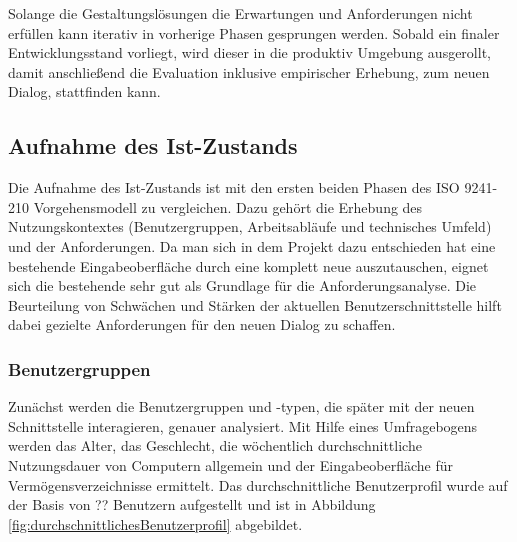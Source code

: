 Solange die Gestaltungslösungen die Erwartungen und Anforderungen nicht erfüllen kann iterativ in vorherige Phasen gesprungen werden. Sobald ein finaler Entwicklungsstand vorliegt, wird dieser in die produktiv Umgebung ausgerollt, damit anschließend die Evaluation inklusive empirischer Erhebung, zum neuen Dialog, stattfinden kann.

\subsection{Aufnahme des Ist-Zustands}
Die Aufnahme des Ist-Zustands ist mit den ersten beiden Phasen des ISO 9241-210 Vorgehensmodell zu vergleichen. Dazu gehört die Erhebung des Nutzungskontextes (Benutzergruppen, Arbeitsabläufe und technisches Umfeld) und der Anforderungen. Da man sich in dem Projekt dazu entschieden hat eine bestehende Eingabeoberfläche durch eine komplett neue  auszutauschen, eignet sich die bestehende sehr gut als Grundlage für die Anforderungsanalyse. Die Beurteilung von Schwächen und Stärken der aktuellen Benutzerschnittstelle hilft dabei gezielte Anforderungen für den neuen Dialog zu schaffen.

\subsubsection{Benutzergruppen}
Zunächst werden die Benutzergruppen und -typen, die später mit der neuen Schnittstelle interagieren, genauer analysiert. Mit Hilfe eines Umfragebogens werden das Alter, das Geschlecht, die wöchentlich durchschnittliche Nutzungsdauer von Computern allgemein und der Eingabeoberfläche für Vermögensverzeichnisse ermittelt. Das durchschnittliche Benutzerprofil wurde auf der Basis von ?? Benutzern aufgestellt und ist in Abbildung \ref{fig:durchschnittlichesBenutzerprofil} abgebildet. 

